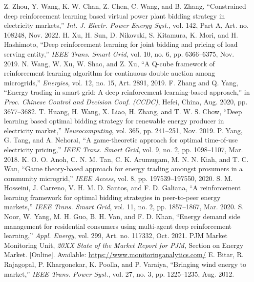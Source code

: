 \documentclass[conference]{IEEEtran}
\begin{document}
\begin{thebibliography}{99}
 Z. Zhou, Y. Wang, K. W. Chan, Z. Chen, C. Wang, and B. Zhang, “Constrained deep reinforcement learning based virtual power plant bidding strategy in electricity markets,” \textit{Int. J. Electr. Power Energy Syst.}, vol. 142, Part A, Art. no. 108248, Nov. 2022. 
 H. Xu, H. Sun, D. Nikovski, S. Kitamura, K. Mori, and H. Hashimoto, “Deep reinforcement learning for joint bidding and pricing of load serving entity,” \textit{IEEE Trans. Smart Grid}, vol. 10, no. 6, pp. 6366–6375, Nov. 2019.
 N. Wang, W. Xu, W. Shao, and Z. Xu, “A Q-cube framework of reinforcement learning algorithm for continuous double auction among microgrids,” \textit{Energies}, vol. 12, no. 15, Art. 2891, 2019. 
 F. Zhang and Q. Yang, “Energy trading in smart grid: A deep reinforcement learning-based approach,” in \textit{Proc. Chinese Control and Decision Conf. (CCDC)}, Hefei, China, Aug. 2020, pp. 3677–3682.
 T. Huang, H. Wang, X. Liao, H. Zhang, and T. W. S. Chow, “Deep learning based optimal bidding strategy for renewable energy producer in electricity market,” \textit{Neurocomputing}, vol. 365, pp. 241–251, Nov. 2019. 
 P. Yang, G. Tang, and A. Nehorai, “A game-theoretic approach for optimal time-of-use electricity pricing,” \textit{IEEE Trans. Smart Grid}, vol. 9, no. 2, pp. 1098–1107, Mar. 2018. 
 K. O. O. Anoh, C. N. M. Tan, C. K. Arumugam, M. N. N. Kiah, and T. C. Wan, “Game theory-based approach for energy trading amongst prosumers in a community microgrid,” \textit{IEEE Access}, vol. 8, pp. 197539–197550, 2020. 
 S. M. Hosseini, J. Carreno, V. H. M. D. Santos, and F. D. Galiana, “A reinforcement learning framework for optimal bidding strategies in peer-to-peer energy markets,” \textit{IEEE Trans. Smart Grid}, vol. 11, no. 2, pp. 1857–1867, Mar. 2020. 
 S. Noor, W. Yang, M. H. Guo, B. H. Van, and F. D. Khan, “Energy demand side management for residential consumers using multi-agent deep reinforcement learning,” \textit{Appl. Energy}, vol. 299, Art. no. 117332, Oct. 2021. 
 PJM Market Monitoring Unit, \textit{20XX State of the Market Report for PJM}, Section on Energy Market. [Online]. Available: \url{https://www.monitoringanalytics.com/} %
 E. Bitar, R. Rajagopal, P. Khargonekar, K. Poolla, and P. Varaiya, “Bringing wind energy to market,” \textit{IEEE Trans. Power Syst.}, vol. 27, no. 3, pp. 1225–1235, Aug. 2012. 

\end{thebibliography}
\end{document}
